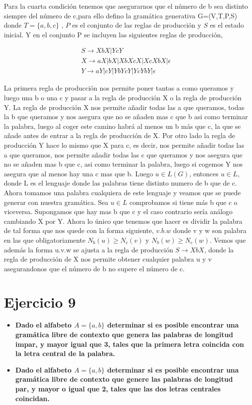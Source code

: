 \documentclass[a4paper,11pt]{article}
\begin{document}
Para la cuarta condición tenemos que asegurarnos que el número de b sea distinto siempre del número de c,para ello defino la gramática generativa G=(V,T,P,S) donde $T=\{a,b,c\}$ , $P$ es el conjunto de las reglas de producción y $S$ es el estado inicial. Y en el conjunto P se incluyen las siguientes reglas de producción,

\begin{align*}
S \rightarrow XbX|YcY  \\
X \rightarrow aX|bX|XbXcX|XcXbX|\epsilon \\
Y \rightarrow aY|cY|YbYcY|YcYbY|\epsilon
\end{align*}

La primera regla de producción nos permite poner tantas a como queramos y luego una b o una c y pasar a la regla de producción X o la regla de producción Y. La regla de producción X nos permite añadir todas las a que queramos, todas la b que queramos y nos asegura que no se añaden mas c que b asi como terminar la palabra, luego al coger este camino habrá al menos un b más que c, la que se añade antes de entrar a la regla de producción de X. Por otro lado la regla de producción Y hace lo mismo que X para c, es decir, nos permite añadir todas las a que queramos, nos permite añadir todas las c que queramos y nos asegura que no se añaden mas b que c, asi como terminar la palabra, luego si cogemos Y nos asegura que al menos hay una c mas que b. Luego $u\in L(G)$, entonces $u\in L$, donde L es el lenguaje donde las palabras tiene distinto numero de b que de c. Ahora tomamos una palabra cualquiera de este lenguaje y veamos que se puede generar con nuestra gramática. Sea $u \in L$ comprobamos si tiene más b que c o viceversa. Supongamos que hay mas b que c y el caso contrario sería análogo cambiando X por Y. Ahora lo único que tenemos que hacer es dividir la palabra de tal forma que nos quede con la forma siguiente, $v . b . w$ donde v y w son palabra en las que obligatoriamente $N_b(u) \geq N_c(v)$ y $N_b(w) \geq N_c(w)$. Vemos que además la forma u.v.w se ajusta a la regla de producción $S \rightarrow XbX$, donde la regla de producción de X nos permite obtener cualquier palabra u y v asegurandonos que el número de b no supere el número de c.

\section{Ejercicio 9}
\begin{itemize}
\item \textbf{Dado el alfabeto $A=\{a,b\}$ determinar si es posible encontrar una gramática libre de contexto que genera las palabras de longitud impar, y mayor igual que 3, tales que la primera letra coincida con la letra central de la palabra.}
\item \textbf{Dado el alfabeto $A=\{a,b\}$ determinar si es posible encontrar una gramática libre de contexto que genere las palabras de longitud par, y mayor o igual que 2, tales que las dos letras centrales coincidan.}
\end{itemize}
\end{document}

